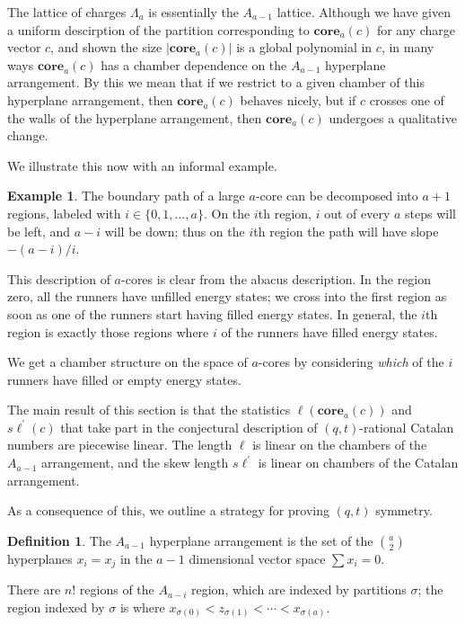 \documentclass{amsart}[12pt]
\theoremstyle{definition}
\newtheorem{example}[dummy]{Example}
\newtheorem{definition}[dummy]{Definition}
\newcommand{\core}{\mathbf{core}}
\newcommand{\sk}{s\ell}
\begin{document}
The lattice of charges $\Lambda_a$ is essentially the $A_{a-1}$ lattice.  Although we have given a uniform descirption of the partition corresponding to $\core_a(c)$ for any charge vector $c$, and shown the size $|\core_a(c)|$ is a global polynomial in $c$, in many ways $\core_a(c)$ has a chamber dependence on the $A_{a-1}$ hyperplane arrangement.  By this we mean that if we restrict to a given chamber of this hyperplane arrangement, then $\core_a(c)$ behaves nicely, but if $c$ crosses one of the walls of the hyperplane arrangement, then $\core_a(c)$ undergoes a qualitative change.


We illustrate this now with an informal example.
\begin{example}
The boundary path of a large $a$-core can be decomposed into $a+1$ regions, labeled with $i\in\{0,1,\dots,a\}$.  On the $i$th region, $i$ out of every $a$ steps will be left, and $a-i$ will be down; thus on the $i$th region the path will have slope $-(a-i)/i$.  

This description of $a$-cores is clear from the abacus description.  In the region zero, all the runners have unfilled energy states; we cross into the first region as soon as one of the runners start having filled energy states.  In general, the $i$th region is exactly those regions where $i$ of the runners have filled energy states.  

We get a chamber structure on the space of $a$-cores by considering \emph{which} of the $i$ runners have filled or empty energy states.  



\end{example}

The main result of this section is that the statistics $\ell(\core_a(c))$ and $\sk^\prime(c)$ that take part in the conjectural description of $(q,t)$-rational Catalan numbers are piecewise linear.  The length $\ell$ is linear on the chambers of the $A_{a-1}$ arrangement, and the skew length $\sk^\prime$ is linear on chambers of the Catalan arrangement.

As a consequence of this, we outline a strategy for proving $(q,t)$ symmetry.



\begin{definition}
The $A_{a-1}$ hyperplane arrangement is the set of the $\binom{a}{2}$ hyperplanes $x_i=x_j$ in the $a-1$ dimensional vector space $\sum x_i=0$.

There are $n!$ regions of the $A_{a-i}$ region, which are indexed by partitions $\sigma$; the region indexed by $\sigma$ is where $x_{\sigma(0)}<z_{\sigma(1)}<\cdots<x_{\sigma(a)}$.
\end{definition}
\end{document}
